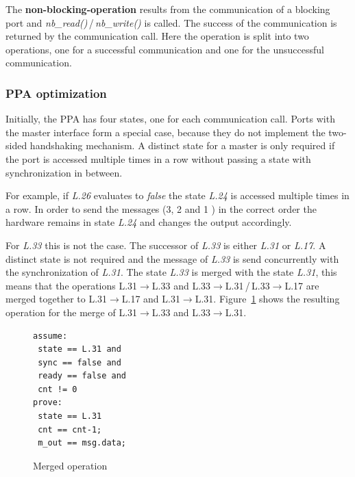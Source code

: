 The \textbf{non-blocking-operation} results from the communication of a blocking port and \textit{nb\_read()}\,/\,\textit{nb\_write()} is called. 
The success of the communication is returned by the communication call. 
Here the operation is split into two operations, one for a successful communication and one for the unsuccessful communication.  

\subsubsection{PPA optimization}

Initially, the PPA has four states, one for each communication call. 
Ports with the master interface form a special case, because they do not implement the two-sided handshaking mechanism. 
A distinct state for a master is only required if the port is accessed multiple times in a row without passing a state with synchronization in between. 

For example, if \textit{L.26} evaluates to \textit{false} the state \textit{L.24} is accessed multiple times in a row. 
In order to send the messages (3, 2 and 1 ) in the correct order the hardware remains in state \textit{L.24} and changes the output accordingly. 

For \textit{L.33} this is not the case. 
The successor of \textit{L.33} is either \textit{L.31} or \textit{L.17}. 
A distinct state is not required and the message of \textit{L.33} is send concurrently with the synchronization of \textit{L.31}. 
The state \textit{L.33} is merged with the state \textit{L.31}, this means that the operations L.31$\rightarrow$L.33 and L.33$\rightarrow$L.31\,/\,L.33$\rightarrow$L.17 are merged together to L.31$\rightarrow$L.17 and L.31$\rightarrow$L.31. 
Figure~\ref{fig:example_merge_state} shows the resulting operation for the merge of  L.31$\rightarrow$L.33 and L.33$\rightarrow$L.31.  

\begin{figure}
		\centering
			\vspace{-20pt}
		\caption{Merged operation}
		\label{fig:example_merge_state}
		\begin{small}
		\begin{lstlisting}
assume:
 state == L.31 and
 sync == false and 	
 ready == false and
 cnt != 0 
prove: 
 state == L.31
 cnt == cnt-1;
 m_out == msg.data;
\end{lstlisting}
\end{small}
\end{figure}
 
